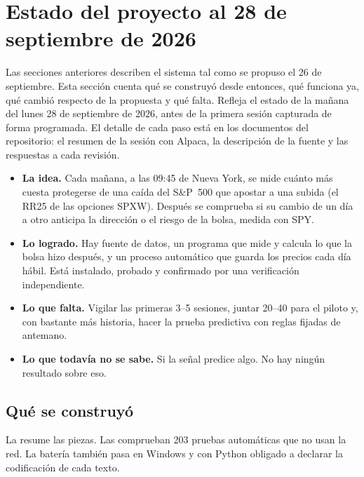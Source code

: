 \clearpage
\section{Estado del proyecto al 28 de septiembre de 2026}\label{sec:estado}

Las secciones anteriores describen el sistema tal como se propuso el 26 de septiembre. Esta sección cuenta
qué se construyó desde entonces, qué funciona ya, qué cambió respecto de la propuesta y qué falta. Refleja
el estado de la mañana del lunes 28 de septiembre de 2026, antes de la primera sesión capturada de forma
programada. El detalle de cada paso está en los documentos del repositorio: el resumen de la sesión con
Alpaca, la descripción de la fuente y las respuestas a cada revisión.

\begin{ideaclave}
\begin{itemize}
\item \textbf{La idea.} Cada mañana, a las 09:45 de Nueva York, se mide cuánto más cuesta protegerse de una
caída del S\&P~500 que apostar a una subida (el RR25 de las opciones SPXW). Después se comprueba si su
cambio de un día a otro anticipa la dirección o el riesgo de la bolsa, medida con SPY.
\item \textbf{Lo logrado.} Hay fuente de datos, un programa que mide y calcula lo que la bolsa hizo después,
y un proceso automático que guarda los precios cada día hábil. Está instalado, probado y confirmado por una
verificación independiente.
\item \textbf{Lo que falta.} Vigilar las primeras 3--5 sesiones, juntar 20--40 para el piloto y, con bastante
más historia, hacer la prueba predictiva con reglas fijadas de antemano.
\item \textbf{Lo que todavía no se sabe.} Si la señal predice algo. No hay ningún resultado sobre eso.
\end{itemize}
\end{ideaclave}

\subsection{Qué se construyó}\label{sec:estado_construido}

La  resume las piezas. Las comprueban 203 pruebas automáticas que no usan la red. La
batería también pasa en Windows y con Python obligado a declarar la codificación de cada texto.

